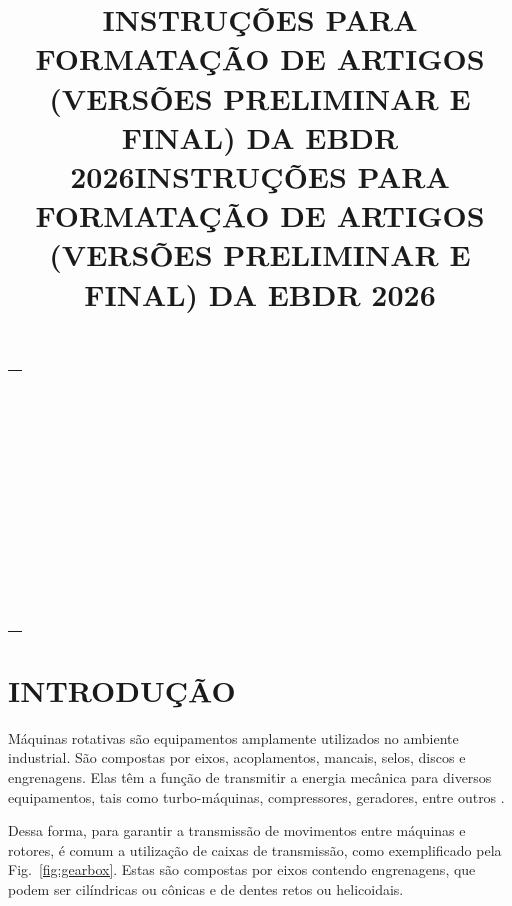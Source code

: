\documentclass[10pt,fleqn,a4paper,twoside]{article}
\begin{document}
	\fphead
	
	\noindent\hspace*{-2.5mm}\begin{tabular}{||c}
		\parbox{0.97\textwidth}{
			\vspace{2mm}
			{\centering \title{INSTRUÇÕES PARA FORMATAÇÃO DE ARTIGOS (VERSÕES PRELIMINAR E FINAL) DA EBDR 2026} \par} \vspace{4mm}
			 \\
			 \\
			 \\
			 \\
			\\
			 \\
			 \\
			 \\
			\\
			 \\
			\\
			\\
			\\
			\vspace{2mm}
		}
	\end{tabular}
	
	\section{INTRODUÇÃO}
	
	Máquinas rotativas são equipamentos amplamente utilizados no ambiente industrial. São compostas por eixos, acoplamentos, mancais, selos, discos e engrenagens. Elas têm a função de transmitir a energia mecânica para diversos equipamentos, tais como turbo-máquinas, compressores, geradores, entre outros \citep{Friswell2010}.
	
	Dessa forma, para garantir a transmissão de movimentos entre máquinas e rotores, é comum a utilização de caixas de transmissão, como exemplificado pela Fig.~\ref{fig:gearbox}. Estas são compostas por eixos contendo engrenagens, que podem ser cilíndricas ou cônicas e de dentes retos ou helicoidais.
	
\end{document}
